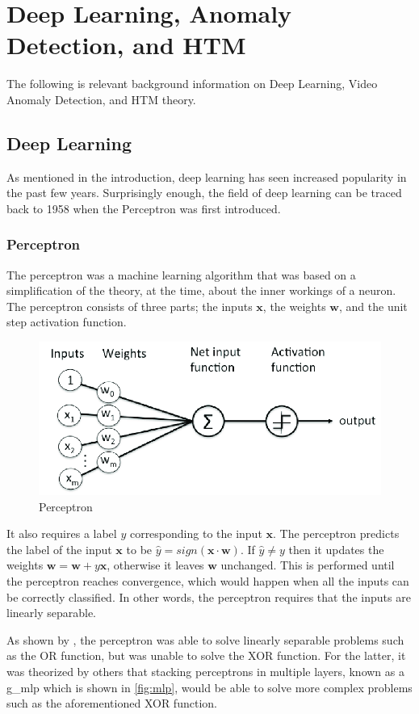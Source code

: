 \chapter{Deep Learning, Anomaly Detection, and HTM}
\label{sec:background}
The following is relevant background information on Deep Learning, Video Anomaly Detection, and HTM theory.
\section{Deep Learning}
As mentioned in the introduction, deep learning has seen increased popularity in the past few years. Surprisingly enough, the field of deep learning can be traced back to 1958 when the Perceptron\cite{perceptron,perceptron2} was first introduced.
\subsection{Perceptron}
The perceptron\cite{perceptron, perceptron2} was a machine learning algorithm that was based on a simplification of the theory, at the time, about the inner workings of a neuron. The perceptron consists of three parts; the inputs $\mathbf{x}$, the weights $\mathbf{w}$, and the unit step activation function.
\begin{figure}[H]
    \centering
    \includegraphics[width=0.6\linewidth]{resources/related_works/perceptron.png}
    \caption{Perceptron}
\end{figure}
It also requires a label $y$ corresponding to the input $\mathbf{x}$. The perceptron predicts the label of the input $\mathbf{x}$ to be $\hat{y}=sign(\mathbf{x}\cdot\mathbf{w})$. If $\hat{y}\neq y$ then it updates the weights $\mathbf{w}=\mathbf{w}+y\mathbf{x}$, otherwise it leaves $\mathbf{w}$ unchanged. This is performed until the perceptron reaches convergence, which would happen when all the inputs can be correctly classified. In other words, the perceptron requires that the inputs are linearly separable.
\par
As shown by \textcite{perceptron3}, the perceptron was able to solve linearly separable problems such as the OR function, but was unable to solve the XOR function. For the latter, it was theorized by others that stacking perceptrons in multiple layers, known as a \gls*{g_mlp} which is shown in \autoref{fig:mlp}, would be able to solve more complex problems such as the aforementioned XOR function\cite{perceptron_misconceptions}.
